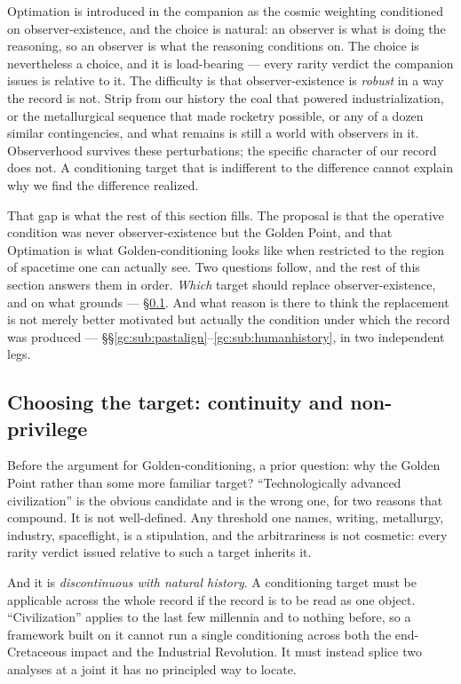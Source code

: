 \documentclass[11pt]{article}
\numberwithin{equation}{section}
\theoremstyle{plain}
\theoremstyle{definition}
\theoremstyle{remark}
\begin{document}
Optimation is introduced in the companion as the cosmic weighting
conditioned on observer-existence, and the choice is natural: an
observer is what is doing the reasoning, so an observer is what the
reasoning conditions on. The choice is nevertheless a choice, and it
is load-bearing --- every rarity verdict the companion issues is
relative to it. The difficulty is that observer-existence is \emph{robust} in a way the
record is not. Strip from our history the coal that powered
industrialization, or the metallurgical sequence that made rocketry
possible, or any of a dozen similar contingencies, and what remains is
still a world with observers in it. Observerhood survives these
perturbations; the specific character of our record does not. A
conditioning target that is indifferent to the difference cannot
explain why we find the difference realized.

That gap is what the rest of this section fills. The proposal is that
the operative condition was never observer-existence but the Golden
Point, and that Optimation is what Golden-conditioning looks like when
restricted to the region of spacetime one can actually see. \noindent Two questions follow, and the rest of this section answers them
in order. \emph{Which} target should replace observer-existence, and on
what grounds --- \S\ref{gc:sub:continuity}. And what reason is there to
think the replacement is not merely better motivated but actually the
condition under which the record was produced ---
\S\S\ref{gc:sub:pastalign}--\ref{gc:sub:humanhistory}, in two
independent legs.

\subsection{Choosing the target: continuity and non-privilege}\label{gc:sub:continuity}

Before the argument for Golden-conditioning, a prior question: why the
Golden Point rather than some more familiar target? ``Technologically
advanced civilization'' is the obvious candidate and is the wrong one,
for two reasons that compound. It is not well-defined. Any threshold one names, writing, metallurgy,
industry, spaceflight, is a stipulation, and the arbitrariness is not
cosmetic: every rarity verdict issued relative to such a target inherits
it.

And it is \emph{discontinuous with natural history}. A conditioning
target must be applicable across the whole record if the record is to be
read as one object. ``Civilization'' applies to the last few millennia
and to nothing before, so a framework built on it cannot run a single
conditioning across both the end-Cretaceous impact and the Industrial
Revolution. It must instead splice two analyses at a joint it has no
principled way to locate.
\end{document}
